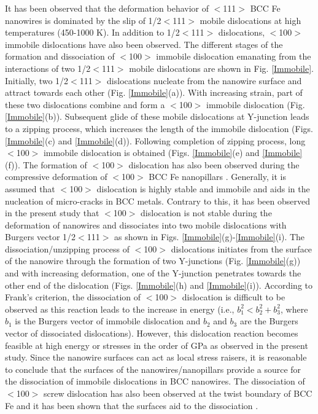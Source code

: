 \documentclass[%
reprint,%
 amssymb, amsmath,%
 aip,apl,%
]{revtex4-1}
\begin{document}
It has been observed that the deformation behavior of $<$111$>$ BCC Fe nanowires is dominated by the slip of 1/2$<$111$>$ mobile 
dislocations at high temperatures (450-1000 K). In addition to 1/2$<$111$>$ dislocations, $<$100$>$ immobile dislocations have 
also been observed. The different stages of the formation and dissociation of $<$100$>$ immobile dislocation emanating from the 
interactions of two 1/2$<$111$>$ mobile dislocations are shown in Fig. \ref{Immobile}. Initially, two 1/2$<$111$>$ dislocations 
nucleate from the nanowire surface and attract towards each other (Fig. \ref{Immobile}(a)). With increasing strain, part
of these two dislocations combine and form a $<$100$>$ immobile dislocation (Fig. \ref{Immobile}(b)). Subsequent glide of these
mobile dislocations at Y-junction leads to a zipping process, which increases the length of the immobile dislocation (Figs. 
\ref{Immobile}(c) and \ref{Immobile}(d)). Following completion of zipping process, long $<$100$>$ immobile dislocation is obtained
(Figs. \ref{Immobile}(e) and \ref{Immobile}(f)). The formation of $<$100$>$ dislocation has also been observed during the compressive 
deformation of $<$100$>$ BCC Fe nanopillars \cite{ADutta}. Generally, it is assumed that $<$100$>$ dislocation is highly stable and 
immobile and aids in the nucleation of micro-cracks in BCC metals. Contrary to this, it has been observed in the present study
that $<$100$>$ dislocation is not stable during the deformation of nanowires and dissociates into two mobile dislocations with 
Burgers vector 1/2$<$111$>$ as shown in Figs. \ref{Immobile}(g)-\ref{Immobile}(i). The dissociation/unzipping process of $<$100$>$ 
dislocations initiates from the surface of the nanowire through the formation of two Y-junctions (Fig. \ref{Immobile}(g)) and with 
increasing deformation, one of the Y-junction penetrates towards the other end of the dislocation (Figs. \ref{Immobile}(h) and 
\ref{Immobile}(i)). According to Frank’s criterion, the dissociation of $<$100$>$ dislocation is difficult to be observed as this 
reaction leads to the increase in energy (i.e., $b_1^2 < b_2^2 + b_3^2$, where $b_1$ is the Burgers vector of immobile dislocation 
and $b_2$ and $b_3$ are the Burgers vector of dissociated dislocations). However, this dislocation reaction becomes feasible at 
high energy or stresses in the order of GPa as observed in the present study. Since the nanowire surfaces can act as local stress
raisers, it is reasonable to conclude that the surfaces of the nanowires/nanopillars provide a source for the dissociation of 
immobile dislocations in BCC nanowires. The dissociation of $<$100$>$ screw dislocation has also been observed at the twist 
boundary of BCC Fe and it has been shown that the surfaces aid to the dissociation \cite{Sai-PhilMagLett}.
\end{document}
